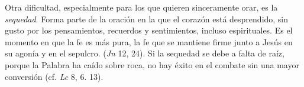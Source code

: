  Otra dificultad, especialmente para los que quieren sinceramente orar, es la \emph{sequedad}. Forma parte de la oración en la que el corazón está desprendido, sin gusto por los pensamientos, recuerdos y sentimientos, incluso espirituales. Es el momento en que la fe es más pura, la fe que se mantiene firme junto a Jesús en su agonía y en el sepulcro.  (\emph{Jn} 12, 24). Si la sequedad se debe a falta de raíz, porque la Palabra ha caído sobre roca, no hay éxito en el combate sin una mayor conversión (cf. \emph{Lc} 8, 6. 13).